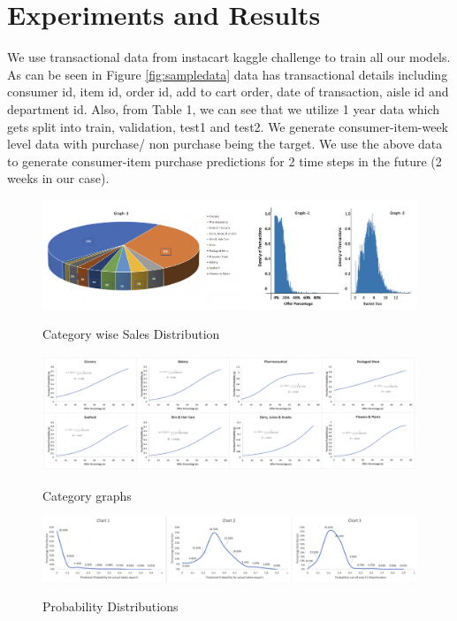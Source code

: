 \section{Experiments and Results}
\label{sec:eval}
We use transactional data from instacart kaggle challenge to train all our models. As can 
be seen in Figure \ref{fig:sampledata} data has transactional details including consumer id, item id, 
order id, add to cart order, date of transaction, aisle id and department id.
Also, from Table 1, we can see that we utilize 1 year data which gets split into train, validation,
test1 and test2. We generate consumer-item-week level data with purchase/ non purchase being the target.
We use the above data to generate consumer-item purchase predictions for 2 time steps in the future (2 weeks in our case).


  \begin{figure}[t]
    \centering 
    \caption{Category wise Sales Distribution} 
    \includegraphics[width=5.5in]{img/sales_dist.png} 
    \label{fig:sales_dist} 
  \end{figure}

  \begin{figure}[t]
    \centering 
    \caption{Category graphs} 
    \includegraphics[width=5.5in]{img/cat_curves.png} 
    \label{fig:cat_curves} 
  \end{figure}

 \begin{figure}[t]
    \centering 
    \caption{Probability Distributions} 
    \includegraphics[width=5.5in]{img/prob_dist.png} 
    \label{fig:prob_dist} 
  \end{figure}

